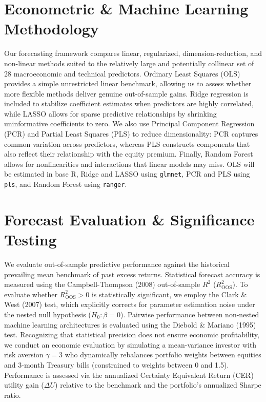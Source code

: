 \documentclass[10pt,a4paper]{article}
\begin{document}
\section{Econometric \& Machine Learning Methodology}
Our forecasting framework compares linear, regularized, dimension-reduction, and non-linear methods suited to the relatively large and potentially collinear set of 28 macroeconomic and technical predictors. Ordinary Least Squares (OLS) provides a simple unrestricted linear benchmark, allowing us to assess whether more flexible methods deliver genuine out-of-sample gains. Ridge regression is included to stabilize coefficient estimates when predictors are highly correlated, while LASSO allows for sparse predictive relationships by shrinking uninformative coefficients to zero. We also use Principal Component Regression (PCR) and Partial Least Squares (PLS) to reduce dimensionality: PCR captures common variation across predictors, whereas PLS constructs components that also reflect their relationship with the equity premium. Finally, Random Forest allows for nonlinearities and interactions that linear models may miss. OLS will be estimated in base R, Ridge and LASSO using \texttt{glmnet}, PCR and PLS using \texttt{pls}, and Random Forest using \texttt{ranger}.

\section{Forecast Evaluation \& Significance Testing}
We evaluate out-of-sample predictive performance against the historical prevailing mean benchmark of past excess returns. Statistical forecast accuracy is measured using the Campbell-Thompson (2008) out-of-sample $R^2$ ($R^2_{\text{OOS}}$). To evaluate whether $R^2_{\text{OOS}} > 0$ is statistically significant, we employ the Clark \& West (2007) test, which explicitly corrects for parameter estimation noise under the nested null hypothesis ($H_0: \beta = 0$). Pairwise performance between non-nested machine learning architectures is evaluated using the Diebold \& Mariano (1995) test. Recognizing that statistical precision does not ensure economic profitability, we conduct an economic evaluation by simulating a mean-variance investor with risk aversion $\gamma = 3$ who dynamically rebalances portfolio weights between equities and 3-month Treasury bills (constrained to weights between 0 and 1.5). Performance is assessed via the annualized Certainty Equivalent Return (CER) utility gain ($\Delta U$) relative to the benchmark and the portfolio's annualized Sharpe ratio.
\end{document}
